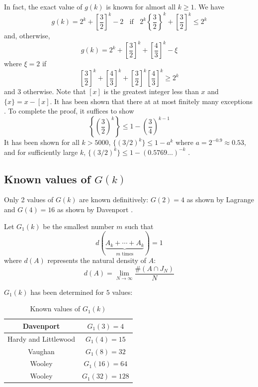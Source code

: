 In fact, the exact value of $g(k)$ is known for almost all $k\ge1$. We have
$$g(k)=2^k+\left[\frac32\right]^k-2\;\;\text{ if }\;\; 2^k\left\{\frac32\right\}^k+\left[\frac32\right]^k\le2^k$$
and, otherwise,
$$g(k)=2^k+\left[\frac32\right]^k+\left[\frac43\right]^k-\xi$$
where $\xi=2$ if $$\left[\frac32\right]^k+\left[\frac43\right]^k+\left[\frac32\right]^k\left[\frac43\right]^k\ge2^k$$
and $3$ otherwise. Note that $[x]$ is the greatest integer less than $x$ and $\{x\}=x-[x]$. It has been shown that there at at most finitely many exceptions \cite{Mahler_1957}. To complete the proof, it suffices to show
$$\left\{\left(\frac32\right)^k\right\}\le1-\left(\frac34\right)^{k-1}$$
It has been shown for all $k > 5000$, $\{(3/2)^k\}\le1-a^{k}$ where $a=2^{-0.9}\approx0.53$, and for sufficiently large $k$, $\{(3/2)^k\}\le1-(0.5769\dots)^{-k}$ \cite{Dubitskas1990ALB} \cite{Bennett_1993}.

\subsection{Known values of $G(k)$}

Only 2 values of $G(k)$ are known definitively: $G(2)=4$ as shown by Lagrange and $G(4)=16$ as shown by Davenport \cite{7dbd7a34-182d-3a8c-ac41-9dfc57f8937a}.

\begin{definition}
    Let $G_1(k)$ be the smallest number $m$ such that
    $$d(\underbrace{A_k+\cdots+A_k}_{m\text{ times}})=1$$
    where $d(A)$ represents the natural density of $A$:
    $$d(A)=\lim_{N\to\infty}\frac{\#(A\cap J_N)}{N}$$
\end{definition}

$G_1(k)$ has been determined for $5$ values:

\begin{table}[ht]
    \def\arraystretch{1.2}
    \centering
    \begin{tabular}{|c|c|}
        \hline
        Davenport \cite{Davenport1939} & $G_1(3)=4$\\
        \hline
        Hardy and Littlewood \cite{Hardy1925} & $G_1(4)=15$\\
        \hline
        Vaughan \cite{Vaughan1986} & $G_1(8)=32$\\
        \hline
        Wooley \cite{wooley_1992} & $G_1(16)=64$\\
        \hline
        Wooley \cite{wooley_1992} & $G_1(32)=128$\\
        \hline
    \end{tabular}
    \caption{Known values of $G_1(k)$}
    \label{tab:G1values}
\end{table}


